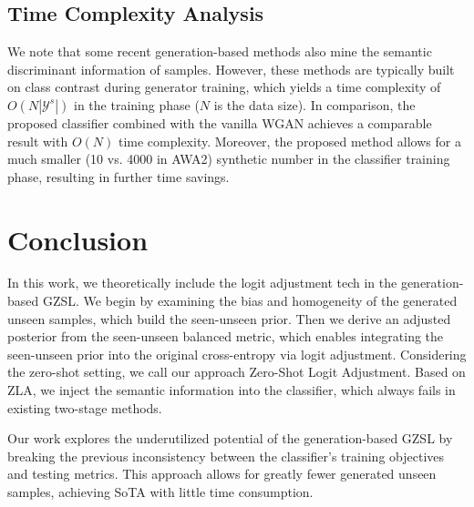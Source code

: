 \documentclass{article}
\begin{document}
\subsection{Time Complexity Analysis}
We note that some recent generation-based methods \cite{han2021contrastive,chen2021semantics} also mine the semantic discriminant information of samples. However, these methods are typically built on class contrast during generator training, which yields a time complexity of $O(N|\mathcal{Y}^s|)$ in the training phase ($N$ is the data size). In comparison, the proposed classifier combined with the vanilla WGAN achieves a comparable result with $O(N)$ time complexity. Moreover, the proposed method allows for a much smaller (10 vs. 4000 in AWA2) synthetic number in the classifier training phase, resulting in further time savings.
\section{Conclusion}
In this work, we theoretically include the logit adjustment tech in the generation-based GZSL. We begin by examining the bias and homogeneity of the generated unseen samples, which build the seen-unseen prior. Then we derive an adjusted posterior from the seen-unseen balanced metric, which enables integrating the seen-unseen prior into the original cross-entropy via logit adjustment. Considering the zero-shot setting, we call our approach Zero-Shot Logit Adjustment. Based on ZLA, we inject the semantic information into the classifier, which always fails in existing two-stage methods.

Our work explores the underutilized potential of the generation-based GZSL by breaking the previous inconsistency between the classifier's training objectives and testing metrics. This approach allows for greatly fewer generated unseen samples, achieving SoTA with little time consumption.

{\small
	}
\end{document}
